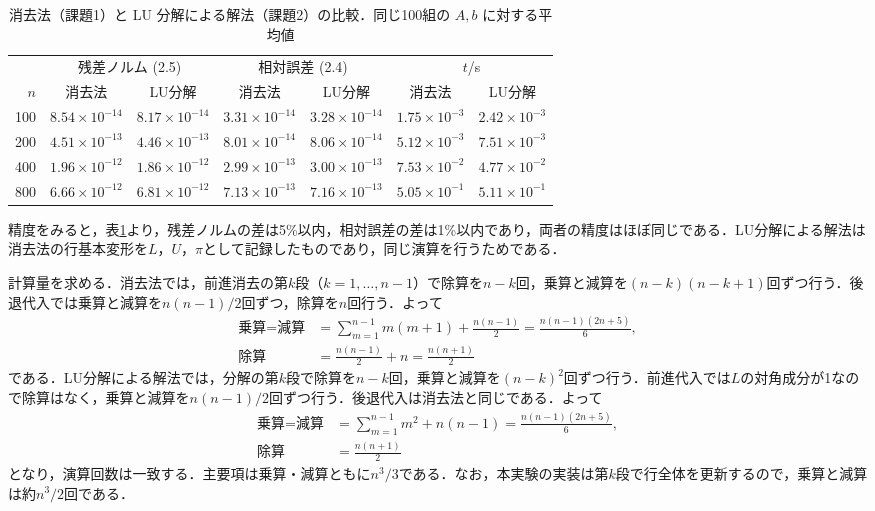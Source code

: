 \documentclass{jarticle}
\begin{document}
\begin{table}[htbp]
    \centering
    \footnotesize\setlength{\tabcolsep}{2pt}
    \caption{消去法（課題1）と LU 分解による解法（課題2）の比較．同じ100組の $A, b$ に対する平均値}
    \label{tab:work3}
    \begin{tabular}{rcccccc}
        \hline
        & \multicolumn{2}{c}{残差ノルム (2.5)} & \multicolumn{2}{c}{相対誤差 (2.4)} & \multicolumn{2}{c}{$t$/s} \\
        $n$ & 消去法 & LU分解 & 消去法 & LU分解 & 消去法 & LU分解 \\
        \hline
        100 & $8.54\times10^{-14}$ & $8.17\times10^{-14}$ & $3.31\times10^{-14}$ & $3.28\times10^{-14}$ & $1.75\times10^{-3}$ & $2.42\times10^{-3}$ \\
        200 & $4.51\times10^{-13}$ & $4.46\times10^{-13}$ & $8.01\times10^{-14}$ & $8.06\times10^{-14}$ & $5.12\times10^{-3}$ & $7.51\times10^{-3}$ \\
        400 & $1.96\times10^{-12}$ & $1.86\times10^{-12}$ & $2.99\times10^{-13}$ & $3.00\times10^{-13}$ & $7.53\times10^{-2}$ & $4.77\times10^{-2}$ \\
        800 & $6.66\times10^{-12}$ & $6.81\times10^{-12}$ & $7.13\times10^{-13}$ & $7.16\times10^{-13}$ & $5.05\times10^{-1}$ & $5.11\times10^{-1}$ \\
        \hline
    \end{tabular}
\end{table}

精度をみると，表\ref{tab:work3}より，残差ノルムの差は5\%以内，相対誤差の差は1\%以内であり，両者の精度はほぼ同じである．LU分解による解法は消去法の行基本変形を$L$，$U$，$\pi$として記録したものであり，同じ演算を行うためである．

計算量を求める．消去法では，前進消去の第$k$段（$k=1,\ldots,n-1$）で除算を$n-k$回，乗算と減算を$(n-k)(n-k+1)$回ずつ行う．後退代入では乗算と減算を$n(n-1)/2$回ずつ，除算を$n$回行う．よって
\begin{align*}
    \text{乗算}=\text{減算}&=\sum_{m=1}^{n-1}m(m+1)+\frac{n(n-1)}{2}=\frac{n(n-1)(2n+5)}{6},\\
    \text{除算}&=\frac{n(n-1)}{2}+n=\frac{n(n+1)}{2}
\end{align*}
である．LU分解による解法では，分解の第$k$段で除算を$n-k$回，乗算と減算を$(n-k)^2$回ずつ行う．前進代入では$L$の対角成分が1なので除算はなく，乗算と減算を$n(n-1)/2$回ずつ行う．後退代入は消去法と同じである．よって
\begin{align*}
    \text{乗算}=\text{減算}&=\sum_{m=1}^{n-1}m^2+n(n-1)=\frac{n(n-1)(2n+5)}{6},\\
    \text{除算}&=\frac{n(n+1)}{2}
\end{align*}
となり，演算回数は一致する．主要項は乗算・減算ともに$n^3/3$である．なお，本実験の実装は第$k$段で行全体を更新するので，乗算と減算は約$n^3/2$回である．
\end{document}
